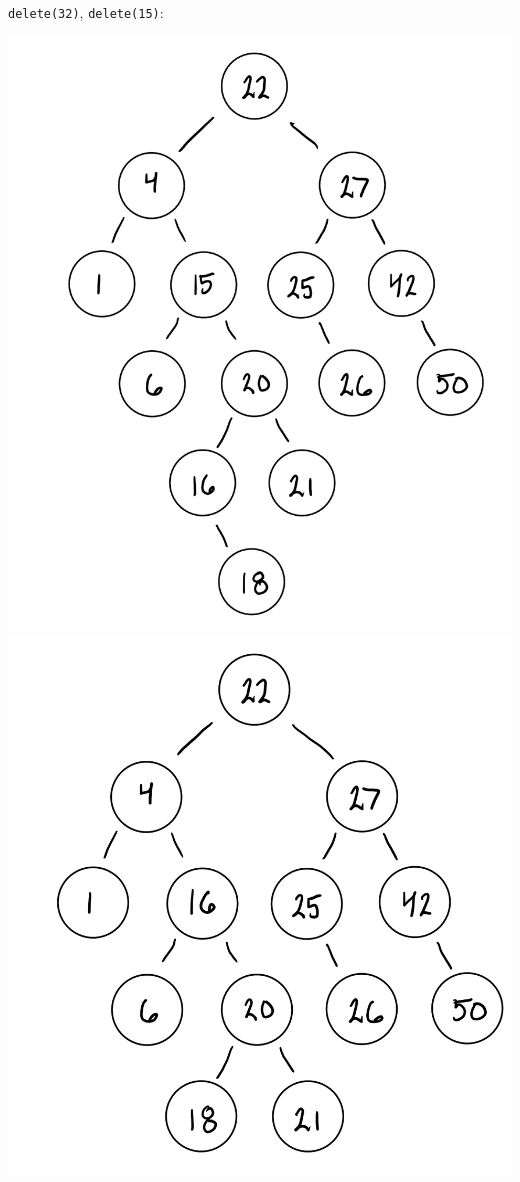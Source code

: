 \documentclass[12pt,twoside]{article}
\begin{document}
\begin{problems}
\begin{problemparts}
    {\tt delete(32)}, {\tt delete(15)}:

    \begin{center}
        \includegraphics[scale=0.25]{Images/P1A5.PNG}
        \includegraphics[scale=0.25]{Images/P1A6.PNG}
    \end{center}


\end{problemparts}
\end{problems}
\end{document}
